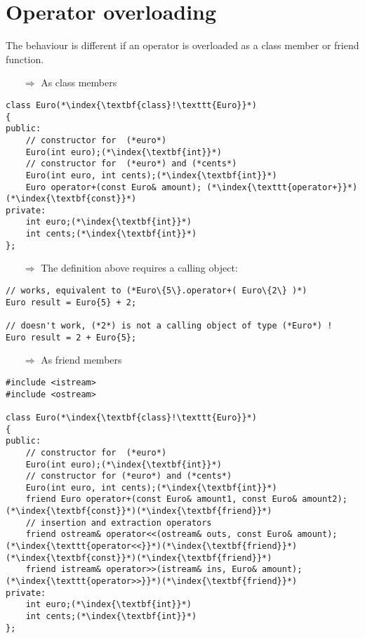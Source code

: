 \documentclass[10pt]{article}
\begin{document}
\section{Operator overloading}
\small
The behaviour is different if an operator is overloaded as  a class member or 
friend function.
\begin{enumerate}
\item[$\Rightarrow$] As class members
\end{enumerate}
\begin{lstlisting}
class Euro(*\index{\textbf{class}!\texttt{Euro}}*)
{
public:
    // constructor for  (*euro*)
    Euro(int euro);(*\index{\textbf{int}}*)
    // constructor for  (*euro*) and (*cents*)
    Euro(int euro, int cents);(*\index{\textbf{int}}*)
    Euro operator+(const Euro& amount); (*\index{\texttt{operator+}}*)(*\index{\textbf{const}}*)
private:
    int euro;(*\index{\textbf{int}}*)
    int cents;(*\index{\textbf{int}}*)
};
\end{lstlisting}
\begin{enumerate}
\item[$\Rightarrow$] The definition above requires a calling object:
\end{enumerate}
\begin{lstlisting}
// works, equivalent to (*Euro\{5\}.operator+( Euro\{2\} )*)
Euro result = Euro{5} + 2; 

// doesn't work, (*2*) is not a calling object of type (*Euro*) !
Euro result = 2 + Euro{5}; 
\end{lstlisting}
\begin{enumerate}
\item[$\Rightarrow$] As friend members
\end{enumerate}
\begin{lstlisting}
#include <istream>
#include <ostream>

class Euro(*\index{\textbf{class}!\texttt{Euro}}*)
{
public:
    // constructor for  (*euro*)
    Euro(int euro);(*\index{\textbf{int}}*)
    // constructor for (*euro*) and (*cents*)
    Euro(int euro, int cents);(*\index{\textbf{int}}*)
    friend Euro operator+(const Euro& amount1, const Euro& amount2);(*\index{\textbf{const}}*)(*\index{\textbf{friend}}*)
    // insertion and extraction operators
    friend ostream& operator<<(ostream& outs, const Euro& amount);(*\index{\texttt{operator<<}}*)(*\index{\textbf{friend}}*)(*\index{\textbf{const}}*)(*\index{\textbf{friend}}*)
    friend istream& operator>>(istream& ins, Euro& amount);(*\index{\texttt{operator>>}}*)(*\index{\textbf{friend}}*)
private:
    int euro;(*\index{\textbf{int}}*)
    int cents;(*\index{\textbf{int}}*)
};
\end{lstlisting}
\end{document}
